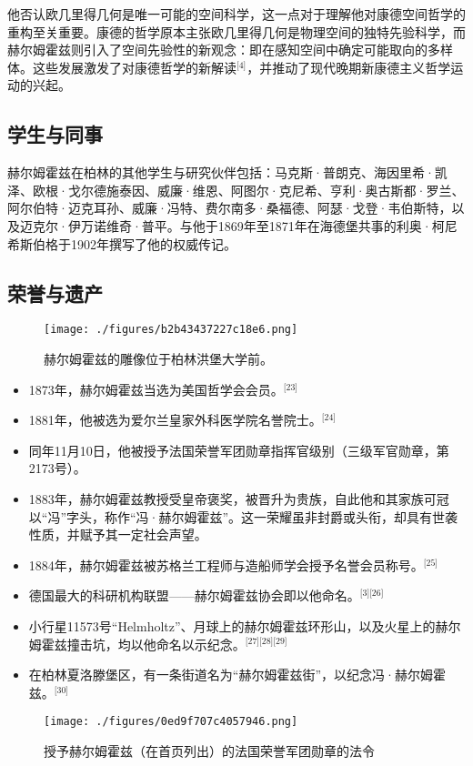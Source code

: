 他否认欧几里得几何是唯一可能的空间科学，这一点对于理解他对康德空间哲学的重构至关重要。康德的哲学原本主张欧几里得几何是物理空间的独特先验科学，而赫尔姆霍兹则引入了空间先验性的新观念：即在感知空间中确定可能取向的多样体。这些发展激发了对康德哲学的新解读\(^\text{[4]}\)，并推动了现代晚期新康德主义哲学运动的兴起。
\subsection{学生与同事}
赫尔姆霍兹在柏林的其他学生与研究伙伴包括：马克斯·普朗克、海因里希·凯泽、欧根·戈尔德施泰因、威廉·维恩、阿图尔·克尼希、亨利·奥古斯都·罗兰、阿尔伯特·迈克耳孙、威廉·冯特、费尔南多·桑福德、阿瑟·戈登·韦伯斯特，以及迈克尔·伊万诺维奇·普平。与他于1869年至1871年在海德堡共事的利奥·柯尼希斯伯格于1902年撰写了他的权威传记。
\subsection{荣誉与遗产}
\begin{figure}[ht]
\centering
\texttt{[image: ./figures/b2b43437227c18e6.png]}
\caption{赫尔姆霍兹的雕像位于柏林洪堡大学前。} \label{fig_HEMfhm_7}
\end{figure}
\begin{itemize}
\item 1873年，赫尔姆霍兹当选为美国哲学会会员。\(^\text{[23]}\)
\item 1881年，他被选为爱尔兰皇家外科医学院名誉院士。\(^\text{[24]}\)
\item 同年11月10日，他被授予法国荣誉军团勋章指挥官级别（三级军官勋章，第2173号）。
\item 1883年，赫尔姆霍兹教授受皇帝褒奖，被晋升为贵族，自此他和其家族可冠以“冯”字头，称作“冯·赫尔姆霍兹”。这一荣耀虽非封爵或头衔，却具有世袭性质，并赋予其一定社会声望。
\item 1884年，赫尔姆霍兹被苏格兰工程师与造船师学会授予名誉会员称号。\(^\text{[25]}\)
\item 德国最大的科研机构联盟——赫尔姆霍兹协会即以他命名。\(^\text{[3][26]}\)
\item 小行星11573号“Helmholtz”、月球上的赫尔姆霍兹环形山，以及火星上的赫尔姆霍兹撞击坑，均以他命名以示纪念。\(^\text{[27][28][29]}\)
\item 在柏林夏洛滕堡区，有一条街道名为“赫尔姆霍兹街”，以纪念冯·赫尔姆霍兹。\(^\text{[30]}\)
\end{itemize}
\begin{figure}[ht]
\centering
\texttt{[image: ./figures/0ed9f707c4057946.png]}
\caption{授予赫尔姆霍兹（在首页列出）的法国荣誉军团勋章的法令} \label{fig_HEMfhm_8}
\end{figure}
